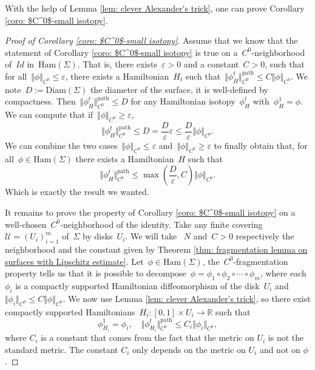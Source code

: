 \documentclass[10pt]{amsart}
\newcommand{\Ham}{\mathrm{Ham}}
\begin{document}
With the help of Lemma \ref{lem: clever Alexander's trick}, one can prove Corollary \ref{coro: $C^0$-small isotopy}.

\begin{proof}[Proof of Corollary \ref{coro: $C^0$-small isotopy}]

Assume that we know that the statement of Corollary \ref{coro: $C^0$-small isotopy} is true on a~$C^0$-neighborhood of~$Id$ in~$\Ham(\Sigma)$. That is, there exists~$\varepsilon>0$ and a constant~$C>0$, such that for all~$\Vert\phi\Vert_{C^0}\leq \varepsilon$, there exists a Hamiltonian~$H_t$ such that~$\Vert\phi_H^t\Vert_{C^0}^{\text{path}} \leq C \Vert \phi \Vert_{C^0}$. We note~$D:=\text{Diam}(\Sigma)$ the diameter of the surface, it is well-defined by compactness. Then~$\Vert \phi_H^t \Vert_{C^0}^{\text{path}}\leq D$ for any Hamiltonian isotopy~$\phi_H^t$ with~$\phi_H^1=\phi$. We can compute that if~$\Vert \phi \Vert_{C^0} \geq \varepsilon$,
$$\Vert \phi_H^t \Vert_{C^0}^{\text{path}}\leq D =\frac{D}{\varepsilon} \varepsilon \leq \frac{D}{\varepsilon} \Vert \phi \Vert_{C^0}.$$
We can combine the two cases~$\Vert \phi \Vert_{C^0} \leq \varepsilon$ and~$\Vert \phi \Vert_{C^0} \geq \varepsilon$ to finally obtain that, for all~$\phi \in \Ham(\Sigma)$ there exists  a Hamiltonian~$H$ such that 
$$\Vert \phi_H^t \Vert_{C^0}^{\text{path}}\leq \max\left(\dfrac{D}{\varepsilon},C\right) \Vert \phi \Vert_{C^0}.$$
Which is exactly the result we wanted.

It remains to prove the property of Corollary \ref{coro: $C^0$-small isotopy} on a well-chosen~$C^0$-neighborhood of the identity. Take any finite covering~$\mathcal{U}=(U_i)_{i=1}^m$ of~$\Sigma$ by disks~$U_i$. We will take ~$N$ and~$C>0$ respectively the neighborhood and the constant given by Theorem \ref{thm: fragmentation lemma on surfaces with Lipschitz estimate}. Let~$\phi \in \Ham(\Sigma)$, the~$C^0$-fragmentation property tells us that it is possible to decompose~$\phi = \phi_1 \circ \phi_2 \circ \cdots \circ \phi_m$, where each~$\phi_i$ is a compactly supported Hamiltonian diffeomorphism of the disk~$U_i$ and~$\Vert \phi_i \Vert_{C^0}\leq C \Vert \phi \Vert_{C^0}$. We now use Lemma \ref{lem: clever Alexander's trick}, so there exist compactly supported Hamiltonians~$H_i: [0,1] \times U_i \rightarrow \mathbb{R}$ such that 
$$\phi_{H_i}^1=\phi_i, \quad \Vert \phi_{H_i}^t \Vert_{C^0}^{\text{path}}\leq C_i \Vert \phi_i \Vert_{C^0},$$
where $C_i$ is a constant that comes from the fact that the metric on $U_i$ is not the standard metric. The constant $C_i$ only depends on the metric on $U_i$ and not on $\phi$.


\end{proof}
\end{document}
